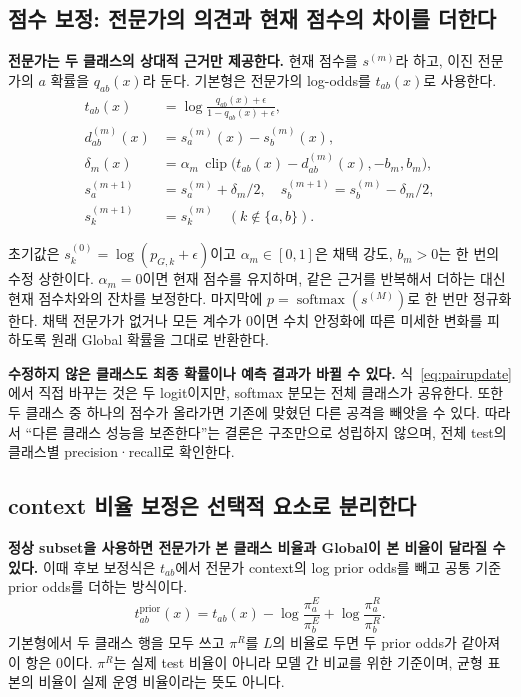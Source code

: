 \subsection{점수 보정: 전문가의 의견과 현재 점수의 차이를 더한다}
\textbf{전문가는 두 클래스의 상대적 근거만 제공한다.} 현재 점수를 $s^{(m)}$라 하고, 이진 전문가의 $a$ 확률을 $q_{ab}(x)$라 둔다. 기본형은 전문가의 log-odds를 $t_{ab}(x)$로 사용한다.
\begin{align}
 t_{ab}(x)&=\log\frac{q_{ab}(x)+\epsilon}{1-q_{ab}(x)+\epsilon},\\
 d_{ab}^{(m)}(x)&=s_a^{(m)}(x)-s_b^{(m)}(x),\\
 \delta_m(x)&=\alpha_m\,\operatorname{clip}
       \bigl(t_{ab}(x)-d_{ab}^{(m)}(x),-b_m,b_m\bigr),\label{eq:delta}\\
 s_a^{(m+1)}&=s_a^{(m)}+\delta_m/2,\quad
 s_b^{(m+1)}=s_b^{(m)}-\delta_m/2,\label{eq:pairupdate}\\
 s_k^{(m+1)}&=s_k^{(m)}\quad(k\notin\{a,b\}).
\end{align}

초기값은 $s_k^{(0)}=\log(p_{G,k}+\epsilon)$이고 $\alpha_m\in[0,1]$은 채택 강도, $b_m>0$는 한 번의 수정 상한이다. $\alpha_m=0$이면 현재 점수를 유지하며, 같은 근거를 반복해서 더하는 대신 현재 점수차와의 잔차를 보정한다. 마지막에 $p=\operatorname{softmax}(s^{(M)})$로 한 번만 정규화한다. 채택 전문가가 없거나 모든 계수가 0이면 수치 안정화에 따른 미세한 변화를 피하도록 원래 Global 확률을 그대로 반환한다.

\textbf{수정하지 않은 클래스도 최종 확률이나 예측 결과가 바뀔 수 있다.} 식~\eqref{eq:pairupdate}에서 직접 바꾸는 것은 두 logit이지만, softmax 분모는 전체 클래스가 공유한다. 또한 두 클래스 중 하나의 점수가 올라가면 기존에 맞혔던 다른 공격을 빼앗을 수 있다. 따라서 ``다른 클래스 성능을 보존한다''는 결론은 구조만으로 성립하지 않으며, 전체 test의 클래스별 precision·recall로 확인한다.

\subsection{context 비율 보정은 선택적 요소로 분리한다}
\textbf{정상 subset을 사용하면 전문가가 본 클래스 비율과 Global이 본 비율이 달라질 수 있다.} 이때 후보 보정식은 $t_{ab}$에서 전문가 context의 log prior odds를 빼고 공통 기준 prior odds를 더하는 방식이다.
\begin{equation}
 t^{\mathrm{prior}}_{ab}(x)=t_{ab}(x)
 -\log\frac{\pi^{E}_a}{\pi^{E}_b}
 +\log\frac{\pi^{R}_a}{\pi^{R}_b}.
\end{equation}
기본형에서 두 클래스 행을 모두 쓰고 $\pi^R$를 $L$의 비율로 두면 두 prior odds가 같아져 이 항은 0이다. $\pi^R$는 실제 test 비율이 아니라 모델 간 비교를 위한 기준이며, 균형 표본의 비율이 실제 운영 비율이라는 뜻도 아니다.


